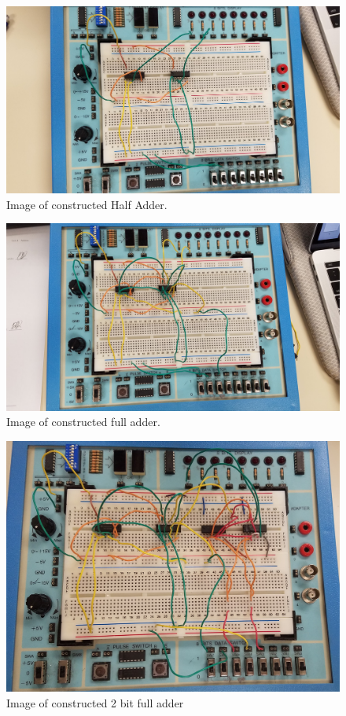 \documentclass[11pt]{article}
\begin{document}
\begin{figure}[!htb]\centering
	\includegraphics[width=.5\textwidth]{HalfAdder} \caption{Image of constructed Half Adder.}
\end{figure}

\begin{figure}[!htb]\centering
	\includegraphics[width=.5\textwidth]{FullAdder} \caption{Image of constructed full adder.}
\end{figure}

\begin{figure}[!htb]\centering
	\includegraphics[width=.5\textwidth]{2BitAdder} \caption{Image of constructed 2 bit full adder}
\end{figure}
\end{document}
